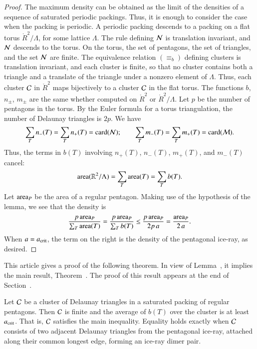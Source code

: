 \begin{proof} The maximum density can be obtained as the limit of the
  densities of a sequence of saturated periodic packings.  Thus, it is
  enough to consider the case when the packing is periodic.  A
  periodic packing descends to a packing on a flat torus
  $\ring{R}^2/\Lambda$, for some lattice $\Lambda$.  The rule defining
  $\mathcal N$ is translation invariant, and $\mathcal N$ descends to the torus.  On
  the torus, the set of pentagons, the set of triangles, and the set
  $\mathcal N$ are finite.  The equivalence relation $(\equiv_b)$ defining
  clusters is translation invariant, and each cluster is finite, so
  that no cluster contains both a triangle and a translate of the
  triangle under a nonzero element of $\Lambda$.  Thus, each cluster
  $\mathcal C$ in $\ring{R}^2$ maps bijectively to a cluster $\mathcal C$ in the flat
  torus.  The functions $b$, $n_\pm$, $m_\pm$ are the same whether
  computed on $\ring{R}^2$ or $\ring{R}^2/\Lambda$.  Let $p$ be the
  number of pentagons in the torus.  By the Euler formula for a torus
  triangulation, the number of Delaunay triangles is $2p$.  We have
\[
\sum_{T} n_-(T) =  \sum_{T} n_+(T) = {\operatorname{card}}(\mathcal N);\qquad
\sum_{T} m_-(T) =  \sum_{T} m_+(T) = {\operatorname{card}}(\mathcal M).
\]
Thus, the terms in $b(T)$ involving $n_+(T)$, $n_-(T)$, $m_+(T)$,
and $m_-(T)$ cancel:
\[
{\operatorname{area}}(\mathbb{R}^2/\Lambda) = \sum_T {\operatorname{area}}(T) = \sum_T b(T).
\]    
Let ${\operatorname{area}}_P$ be the area of a regular pentagon.  Making use of the
hypothesis of the lemma, we see that the density is
\[
\frac{p\, {\operatorname{area}}_P}{\sum_T {\operatorname{area}}(T)} 
=\frac{p\, {\operatorname{area}}_P}{\sum_T b(T)} \le\frac{p\, {\operatorname{area}}_P}{2 p\, a} 
= \frac{{\operatorname{area}}_P}{2\, a}.
\]
When $a=a_\text{crit}$, the term on the right is the density of the
pentagonal ice-ray, as desired.
\end{proof}

This article gives a proof of the following theorem. In view of
Lemma~, it implies the main result,
Theorem~.  The proof of this result appears at the end
of Section~.

\begin{theorem}
  Let $\mathcal C$ be a cluster of Delaunay triangles in a saturated packing
  of regular pentagons.  Then $\mathcal C$ is finite and the average of $b(T)$
  over the cluster is at least $a_\text{crit}$.  That is, $\mathcal C$ satisfies the
  main inequality.  Equality holds exactly when $\mathcal C$ consists of two
  adjacent Delaunay triangles from the pentagonal ice-ray, attached
  along their common longest edge, forming an ice-ray dimer pair.
\end{theorem}

